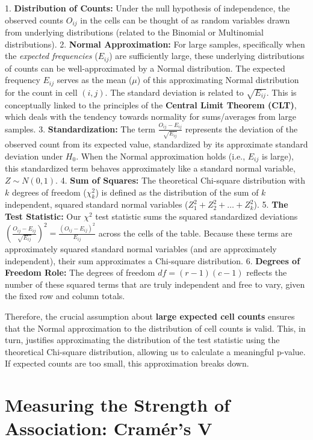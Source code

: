 \documentclass{article}
\begin{document}
1.  \textbf{Distribution of Counts:} Under the null hypothesis of independence, the observed counts $O_{ij}$ in the cells can be thought of as random variables drawn from underlying distributions (related to the Binomial or Multinomial distributions).
2.  \textbf{Normal Approximation:} For large samples, specifically when the \textit{expected frequencies} ($E_{ij}$) are sufficiently large, these underlying distributions of counts can be well-approximated by a Normal distribution. The expected frequency $E_{ij}$ serves as the mean ($\mu$) of this approximating Normal distribution for the count in cell $(i, j)$. The standard deviation is related to $\sqrt{E_{ij}}$. This is conceptually linked to the principles of the \textbf{Central Limit Theorem (CLT)}, which deals with the tendency towards normality for sums/averages from large samples.
3.  \textbf{Standardization:} The term $\frac{O_{ij} - E_{ij}}{\sqrt{E_{ij}}}$ represents the deviation of the observed count from its expected value, standardized by its approximate standard deviation under $H_0$. When the Normal approximation holds (i.e., $E_{ij}$ is large), this standardized term behaves approximately like a standard normal variable, $Z \sim N(0, 1)$.
4.  \textbf{Sum of Squares:} The theoretical Chi-square distribution with $k$ degrees of freedom ($\chi^2_k$) is defined as the distribution of the sum of $k$ independent, squared standard normal variables ($Z_1^2 + Z_2^2 + \dots + Z_k^2$).
5.  \textbf{The Test Statistic:} Our $\chi^2$ test statistic sums the squared standardized deviations $\left(\frac{O_{ij} - E_{ij}}{\sqrt{E_{ij}}}\right)^2 = \frac{(O_{ij} - E_{ij})^2}{E_{ij}}$ across the cells of the table. Because these terms are approximately squared standard normal variables (and are approximately independent), their sum approximates a Chi-square distribution.
6.  \textbf{Degrees of Freedom Role:} The degrees of freedom $df = (r-1)(c-1)$ reflects the number of these squared terms that are truly independent and free to vary, given the fixed row and column totals.

Therefore, the crucial assumption about \textbf{large expected cell counts} ensures that the Normal approximation to the distribution of cell counts is valid. This, in turn, justifies approximating the distribution of the test statistic using the theoretical Chi-square distribution, allowing us to calculate a meaningful p-value. If expected counts are too small, this approximation breaks down.

\section{Measuring the Strength of Association: Cramér's V}
\end{document}
